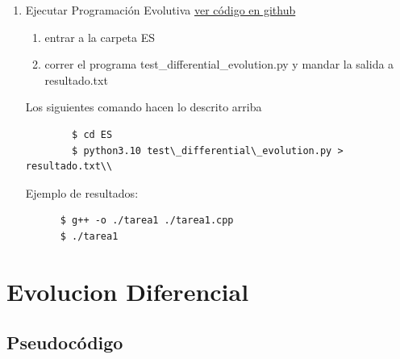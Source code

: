 \documentclass{article}
\begin{document}
\begin{enumerate} 
\item Ejecutar Programación Evolutiva
  \href{https://github.com/luisballado/ADA/blob/main/practice_code/tarea1.cpp}{ver código en github}\\
  \begin{enumerate}
  \item entrar a la carpeta ES \\
  \item correr el programa test\_differential\_evolution.py y mandar la salida a resultado.txt\\
  \end{enumerate} 
  
  Los siguientes comando hacen lo descrito arriba

  \begin{commandline}
     \begin{verbatim}
        $ cd ES
        $ python3.10 test\_differential\_evolution.py > resultado.txt\\
     \end{verbatim}
  \end{commandline}

  Ejemplo de resultados:
  \begin{commandline}
	\begin{verbatim}
	  $ g++ -o ./tarea1 ./tarea1.cpp
	  $ ./tarea1
	\end{verbatim}
  \end{commandline}
\end{enumerate}


\newpage
\section{Evolucion Diferencial}
\subsection{Pseudocódigo}
\end{document}

